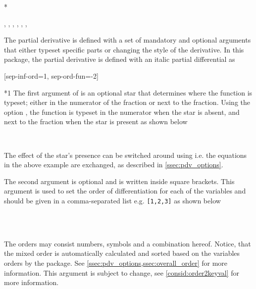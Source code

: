 \documentclass[final,british,10pt]{scrartcl}
\theoremstyle{remark}
\begin{document}
	\begin{function}*{\pdv}
		\begin{syntax}
			\sarg, , , , \targ{/}, , 
		\end{syntax}
		The partial derivative  is defined with a set of mandatory and optional arguments that either typeset specific parts or changing the style of the derivative. In this package, the partial derivative is defined with an italic partial differential as
		
		\begin{definition}
			\DeclarePdvVariant{\pdv}{\partial}[sep-inf-ord=1, sep-ord-fun=-2]%
		\end{definition}
		
		\begin{argument}*{1}
			The first argument of  is an optional star that determines where the function is typeset; either in the numerator of the fraction or next to the fraction. Using the
			option , the function is typeset in the numerator when the star is absent, and next to the fraction when the star is present as shown below
			
			\begin{example}
				 \\
			\end{example}
			
			\noindent The effect of the star's presence can be switched around using  i.e. the equations in the above example are exchanged, as described in \cref{ssec:pdv_options}.
		\end{argument}
		
		\begin{argument}{2}
			The second argument is optional and is written inside square brackets. This argument is used to set the order of differentiation for each of the variables and should be given in a comma-separated list e.g. \texttt{[1,2,3]} as shown below
			
			\begin{example}
				\pdv[2,3]{f}{x,y} \\
				\pdv[\beta,a,n+2a]{f}{x,y,z} \\
				\pdv[2,n^2,n^2-1]{f}{x,y,z}
			\end{example}
			
			The orders may consist numbers, symbols and a combination hereof. Notice, that the mixed order is automatically calculated and sorted based on the variables orders by the package. See \cref{ssec:pdv_options,ssec:overall_order} for more information. This argument is subject to change, see \cref{consid:order2keyval} for more information.
		\end{argument}
		

\end{function}
\end{document}

